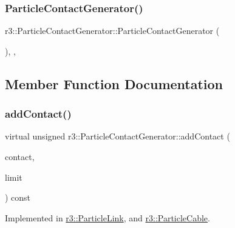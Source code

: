 \mbox{\label{classr3_1_1_particle_contact_generator_a3cfeb03fe6fb6a82a64746c0dd9b89f2}} 
\subsubsection{\texorpdfstring{Particle\+Contact\+Generator()}{ParticleContactGenerator()}}
{\footnotesize\ttfamily r3\+::\+Particle\+Contact\+Generator\+::\+Particle\+Contact\+Generator (\begin{DoxyParamCaption}{ }\end{DoxyParamCaption})\hspace{0.3cm}{\ttfamily [explicit]}, {\ttfamily [protected]}, {\ttfamily [default]}}



\subsection{Member Function Documentation}
\mbox{\label{classr3_1_1_particle_contact_generator_a3c9c99fb97a4431f0ddf300b30167d03}} 
\subsubsection{\texorpdfstring{add\+Contact()}{addContact()}}
{\footnotesize\ttfamily virtual unsigned r3\+::\+Particle\+Contact\+Generator\+::add\+Contact (\begin{DoxyParamCaption}\item[{\mbox{\hyperlink{classr3_1_1_particle_contact}{Particle\+Contact}} $\ast$}]{contact,  }\item[{unsigned int}]{limit }\end{DoxyParamCaption}) const\hspace{0.3cm}{\ttfamily [pure virtual]}}



Implemented in \mbox{\hyperlink{classr3_1_1_particle_link_a07abe1381e0b5ed7e1597099dc0c072d}{r3\+::\+Particle\+Link}}, and \mbox{\hyperlink{classr3_1_1_particle_cable_af8024236316ae2cf7bd68a0e906ed7c7}{r3\+::\+Particle\+Cable}}.



